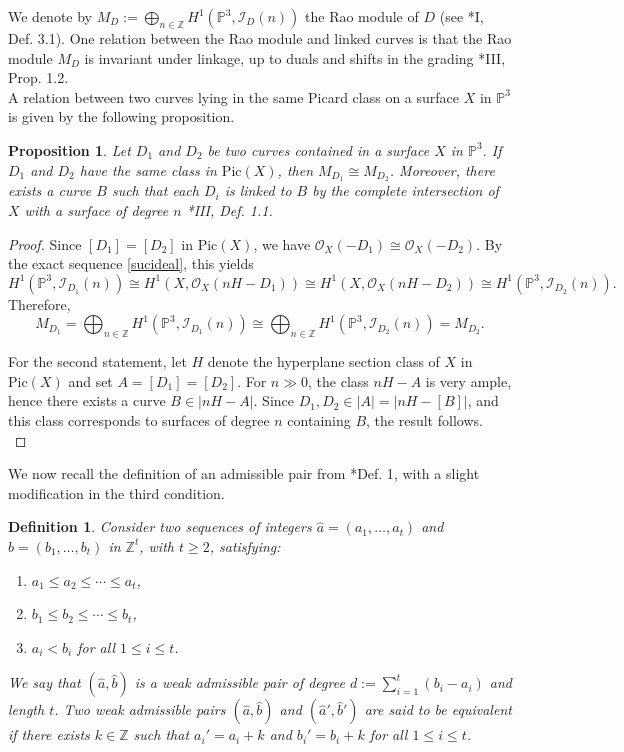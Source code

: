 \documentclass[12pt,reqno]{amsart}
\theoremstyle{plain}
\newtheorem{prop}[theorem]{Proposition}
\newtheorem{defi}[theorem]{Definition}
\theoremstyle{definition}
\theoremstyle{remark}
\theoremstyle{definition}
\newcommand{\PP}{\mathds{P}}
\newcommand{\PPP}{\PP^{3}}
\newcommand{\ii}{\mathscr{I}}
\newcommand{\oo}{\mathcal{O}}
\begin{document}
We denote by $M_{D}:=\bigoplus_{n\in\mathds{Z}} H^{1}(\PPP,\ii_{D}(n))$ the Rao module of $D$ (see \cite{mdp2}*{I, Def. 3.1}). One relation between the Rao module and linked curves is that the Rao module $M_{D}$ is invariant under linkage, up to duals and shifts in the grading \cite{mdp2}*{III, Prop. 1.2}.\\

A relation between two curves lying in the same Picard class on a surface $X$ in $\PPP$ is given by the following proposition.

\begin{prop}\label{propclases}
Let $D_{1}$ and $D_{2}$ be two curves contained in a surface $X$ in $\PPP$. If $D_{1}$ and $D_{2}$ have the same class in $\mathrm{Pic}(X)$, then $M_{D_{1}}\cong M_{D_{2}}$. Moreover, there exists a curve $B$ such that each $D_{i}$ is linked to $B$ by the complete intersection of $X$ with a surface of degree $n$ \cite{mdp2}*{III, Def. 1.1}.
\end{prop}

\begin{proof}
Since $[D_{1}]=[D_{2}]$ in $\mathrm{Pic}(X)$, we have $\oo_{X}(-D_{1})\cong \oo_{X}(-D_{2})$. By the exact sequence \eqref{sucideal}, this yields
\[
H^{1}(\PPP, \ii_{D_{1}}(n))\cong H^{1}(X, \oo_{X}(nH-D_{1}))
\cong H^{1}(X,\oo_{X}(nH-D_{2}))
\cong H^{1}(\PPP, \ii_{D_{2}}(n)).
\]
Therefore,
\[
M_{D_{1}}=\bigoplus_{n\in\mathds{Z}} H^{1}(\PPP,\ii_{D_{1}}(n))
\cong
\bigoplus_{n\in\mathds{Z}} H^{1}(\PPP,\ii_{D_{2}}(n))
= M_{D_{2}}.
\]

For the second statement, let $H$ denote the hyperplane section class of $X$ in $\mathrm{Pic}(X)$ and set $A=[D_{1}]=[D_{2}]$. For $n\gg0$, the class $nH-A$ is very ample, hence there exists a curve $B\in |nH-A|$. Since $D_{1},D_{2}\in |A|=|nH-[B]|$, and this class corresponds to surfaces of degree $n$ containing $B$, the result follows.\\
\end{proof}

We now recall the definition of an admissible pair from \cite{LLV}*{Def. 1}, with a slight modification in the third condition.

\begin{defi}\label{def::admissiblePair}
Consider two sequences of integers $\hat{a}=(a_1,\ldots,a_t)$ and $\hat{b}=(b_1,\ldots,b_t)$ in $\mathbb{Z}^t$, with $t\geq2$, satisfying:
\begin{enumerate}[label=(\roman*)]
    \item $a_1\leq a_2\leq\cdots\leq a_t$,
    \item $b_1\leq b_2\leq\cdots\leq b_t$,
    \item $a_i<b_i$ for all $1\leq i\leq t$.
\end{enumerate}
We say that $(\hat{a},\hat{b})$ is a \textit{weak admissible pair} of degree $d:=\sum_{i=1}^{t}(b_i-a_i)$ and length $t$. Two weak admissible pairs $(\hat{a},\hat{b})$ and $(\hat{a}',\hat{b}')$ are said to be \textit{equivalent} if there exists $k\in\mathbb{Z}$ such that $a_i'=a_i+k$ and $b_i'=b_i+k$ for all $1\leq i\leq t$.
\end{defi}
\end{document}
